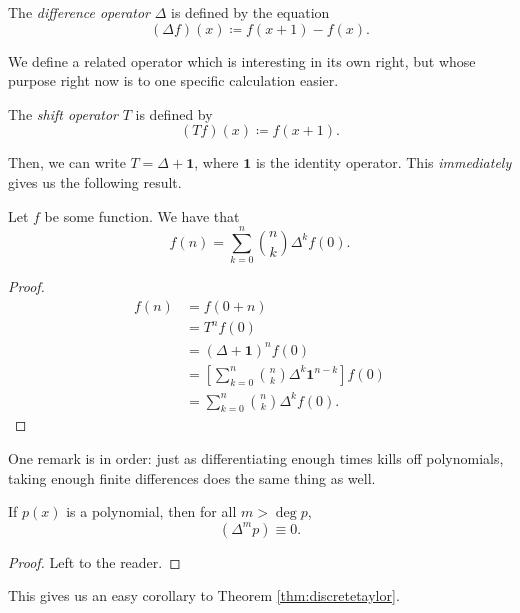 \documentclass{article}
\DeclareMathOperator{\degree}{deg}
\begin{document}
\begin{definition}\label{def:differenceoperator}
    The \textit{difference operator} $\Delta$ is defined by the equation
    \[
        (\Delta f)(x) \coloneq f(x+1) - f(x).
    \]
\end{definition}

We define a related operator which is interesting in its own right, but whose purpose right now is to one specific calculation easier.

\begin{definition}
    The \textit{shift operator} $T$ is defined by
    \[
        (Tf)(x) \coloneq f(x+1).
    \]
\end{definition}

Then, we can write $T = \Delta + \mathbf{1}$, where $\mathbf{1}$ is the identity operator.
This \textit{immediately} gives us the following result.

\begin{theorem}\label{thm:discretetaylor}
    Let $f$ be some function.
    We have that
    \[
        f(n) = \sum_{k=0}^n \binom{n}{k} \Delta^k f(0).
    \]
\end{theorem}

\begin{proof}
    \begin{align*}
        f(n) &= f(0+n) \\
             &= T^nf(0) \\
             &= (\Delta + \mathbf{1})^n f(0) \\
             &= \left[\sum_{k=0}^n \binom{n}{k} \Delta^k\mathbf{1}^{n-k}\right] f(0) \\
             &= \sum_{k=0}^n \binom{n}{k} \Delta^k f(0).
    \end{align*}
\end{proof}

One remark is in order: just as differentiating enough times kills off polynomials, taking enough finite differences does the same thing as well.

\begin{remark}
    If $p(x)$ is a polynomial, then for all $m > \degree p$,
    \[
        (\Delta^m p) \equiv 0.
    \]
\end{remark}

\begin{proof}
    Left to the reader.
\end{proof}

This gives us an easy corollary to Theorem \ref{thm:discretetaylor}.
\end{document}
